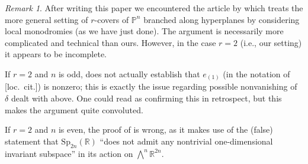 \documentclass[12pt,letterpaper,english]{amsart}
\numberwithin{equation}{section}
\numberwithin{figure}{section}
\theoremstyle{plain}
\theoremstyle{remark}
\newtheorem{rem}[equation]{Remark}
\theoremstyle{definition}
\theoremstyle{definition}
\theoremstyle{plain}
\theoremstyle{plain}
\theoremstyle{plain}
\theoremstyle{plain}
\theoremstyle{definition}
\def\RR{\mathbb{R}}
\def\PP{\mathbb{P}}
\theoremstyle{definition}
\begin{document}
\begin{rem}\label{E15}
After writing this paper we encountered the article by \cite{Xu} which treats the more general setting of $r$-covers of $\PP^n$ branched along hyperplanes by considering local monodromies (as we have just done).  The argument is necessarily more complicated and technical than ours.  However, in the case $r=2$ (i.e., our setting) it appears to be incomplete.

If $r=2$ and $n$ is odd,  \cite[Prop.~3.4]{Xu} does not actually establish that $e_{(1)}$ (in the notation of [loc.~cit.]) is nonzero; this is exactly the issue regarding possible nonvanishing of $\delta$ dealt with above.  One could read \cite[Prop.~4.2]{Xu} as confirming this in retrospect, but this makes the argument quite convoluted.

If $r=2$ and $n$ is even, the proof of \cite[Prop.~4.2]{Xu} is wrong, as it makes use of the (false) statement that $\mathrm{Sp}_{2n}(\RR)$ ``does not admit any nontrivial one-dimensional invariant subspace'' in its action on $\bigwedge^n\RR^{2n}$.
\end{rem}
\end{document}
